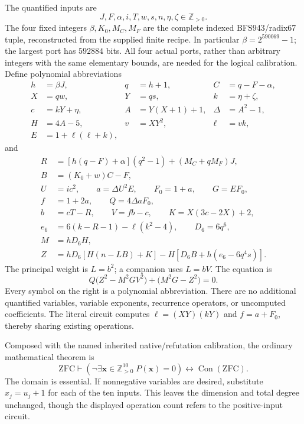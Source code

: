 \documentclass[11pt]{article}
\begin{document}
The quantified inputs are
\[
 J,F,\alpha,i,T,w,s,n,\eta,\zeta\in\mathbb Z_{>0}.
\]
The four fixed integers $\beta,K_0,M_C,M_F$ are the complete indexed
BFS943/radix67 tuple, reconstructed from the supplied finite recipe.
In particular $\beta=2^{590069}-1$; the largest port has $592884$ bits.
All four actual ports, rather than arbitrary integers with the same
elementary bounds, are needed for the logical calibration.
Define polynomial abbreviations
\begin{align*}
 h&=\beta J,&q&=h+1,& C&=q-F-\alpha,\\
 X&=qw,&Y&=qs,&k&=\eta+\zeta,\\
 c&=kY+\eta,&A&=Y(X+1)+1,&\Delta&=A^2-1,\\
 H&=4A-5,&v&=XY^2,&\ell&=vk,\\
 E&=1+\ell(\ell+k),&&&
\end{align*}
and
\begin{align*}
 R&=[h(q-F)+\alpha](q^2-1)+(M_C+qM_F)J,\\
 B&=(K_0+w)C-F,\\
 U&=ic^2,\qquad a=\Delta U^2E,\qquad F_0=1+a,\qquad G=EF_0,\\
 f&=1+2a,\qquad Q=4\Delta aF_0,\\
 b&=cT-R,\qquad V=fb-c,\qquad K=X(3c-2X)+2,\\
 e_6&=6(k-R-1)-\ell(k^2-4),\qquad D_6=6q^6,\\
 M&=hD_6H,\\
 Z&=hD_6[H(n-LB)+K]-H[D_6B+h(e_6-6q^4s)] .
\end{align*}
The principal weight is $L=b^2$; a companion uses $L=bV$.
The equation is
\begin{equation}
 \boxed{\;Q\bigl(Z^2-M^2GV^2\bigr)+\bigl(M^2G-Z^2\bigr)=0.\;}
 \label{eq:compact232}
\end{equation}
Every symbol on the right is a polynomial abbreviation.  There are no
additional quantified variables, variable exponents, recurrence operators,
or uncomputed coefficients.  The literal circuit computes
$\ell=(XY)(kY)$ and $f=a+F_0$, thereby sharing existing operations.

Composed with the named inherited native/refutation calibration, the
ordinary mathematical theorem is
\[
 \mathrm{ZFC}\vdash
 \left(\neg\exists\boldsymbol{x}\in\mathbb Z_{>0}^{10}\;
 P(\boldsymbol{x})=0\right)
 \longleftrightarrow\operatorname{Con}(\mathrm{ZFC}).
\]
The domain is essential.  If nonnegative variables are desired, substitute
$x_j=u_j+1$ for each of the ten inputs.  This leaves the dimension and
total degree unchanged, though the displayed operation count refers to
the positive-input circuit.
\end{document}
